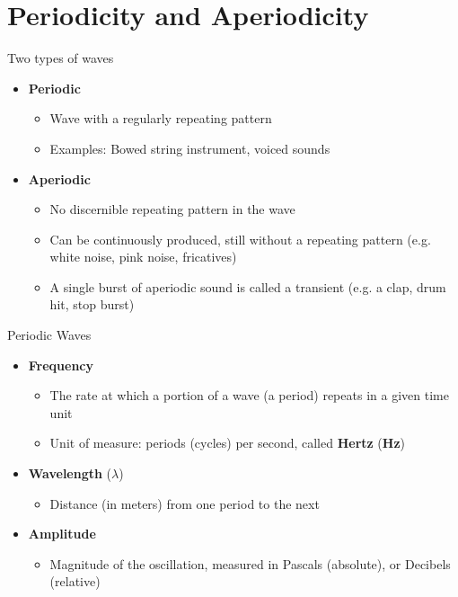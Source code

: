 \documentclass[professionalfonts]{beamer}
\begin{document}
\section*{Periodicity and Aperiodicity}

\begin{frame}{Two types of waves}
    \begin{itemize}
        \item \textbf{Periodic}
        \begin{itemize}
            \item Wave with a regularly repeating pattern 
            \item Examples: Bowed string instrument, voiced sounds 
        \end{itemize}
        \item \textbf{Aperiodic}
        \begin{itemize}
            \item No discernible repeating pattern in the wave 
            \item Can be continuously produced, still without a repeating pattern (e.g. white noise, pink noise, fricatives) 
            \item A single burst of aperiodic sound is called a transient (e.g. a clap, drum hit, stop burst)
        \end{itemize}
    \end{itemize}
\end{frame}


\begin{frame}{Periodic Waves}
    \begin{itemize}
        \item \textbf{Frequency} 
        \begin{itemize}
            \item The rate at which a portion of a wave (a period) repeats in a given time unit 
            \item Unit of measure: periods (cycles) per second, called \textbf{Hertz} (\textbf{Hz})
        \end{itemize}
        \item \textbf{Wavelength} ($\lambda$)
        \begin{itemize}
            \item Distance (in meters) from one period to the next
        \end{itemize}
        \item \textbf{Amplitude}
        \begin{itemize}
            \item Magnitude of the oscillation, measured in Pascals (absolute), or Decibels (relative)
        \end{itemize}
    \end{itemize}
\end{frame}
\end{document}
